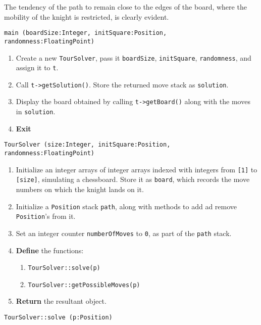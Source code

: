 The tendency of the path to remain close to the edges of the board, where the mobility of the knight is restricted, is clearly evident.

\algorithm
{\tt main (boardSize:Integer, initSquare:Position, randomness:FloatingPoint)}
\begin{enumerate}
	\item	Create a new {\tt TourSolver}, pass it {\tt boardSize}, {\tt initSquare}, {\tt randomness},
			and assign it to {\tt t}.
	\item	Call {\tt t->getSolution()}. Store the returned move stack as {\tt solution}.
	\item	Display the board obtained by calling {\tt t->getBoard()} along with the moves in {\tt solution}.
	\item	{\bf Exit}
\end{enumerate}
\vspace{8mm}
{\tt TourSolver (size:Integer, initSquare:Position, randomness:FloatingPoint)}
\begin{enumerate}
	\item	Initialize an integer arrays of integer arrays indexed with integers from {\tt [1]} to 
			{\tt [size]}, simulating a chessboard. Store it as {\tt board}, which records the 
			move numbers on which the knight lands on it.
	\item	Initialize a {\tt Position} stack {\tt path}, along with methods to add ad remove {\tt Position}'s from it.
	\item	Set an integer counter {\tt numberOfMoves} to {\tt 0}, as part of the {\tt path} stack.
	\item	{\bf Define} the functions: 
	\begin{enumerate}
		\item	{\tt TourSolver::solve(p)}
		\item	{\tt TourSolver::getPossibleMoves(p)}
	\end{enumerate}
	\item	{\bf Return} the resultant object.
\end{enumerate}
\vspace{5mm}
{\tt TourSolver::solve (p:Position)}
